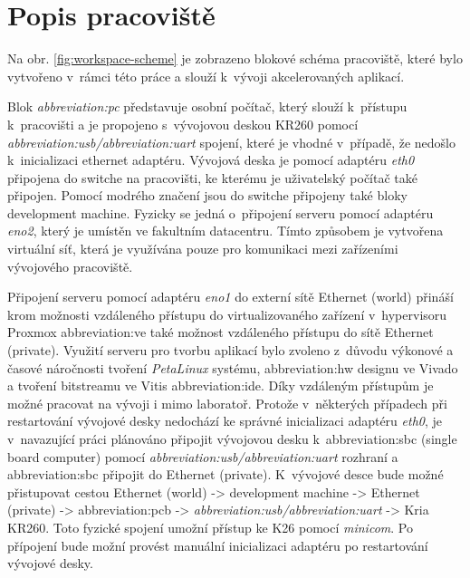 \documentclass[a4paper, twoside, 11pt]{article}
\newcommand{\fbar}{\FloatBarrier}
\begin{document}
	\fbar
\section{Popis pracoviště}\label{sec:popis-pracoviste}
	Na obr. \ref{fig:workspace-scheme} je zobrazeno blokové schéma pracoviště, které bylo vytvořeno v~rámci této práce a slouží k~vývoji akcelerovaných aplikací.\par
	Blok \textit{\gls{abbreviation:pc}} představuje osobní počítač, který slouží k~přístupu k~pracovišti a je propojeno s~vývojovou deskou KR260 pomocí \textit{\gls{abbreviation:usb}/\gls{abbreviation:uart}} spojení, které je vhodné v~případě, že nedošlo k~inicializaci ethernet adaptéru. Vývojová deska je pomocí adaptéru \textit{eth0} připojena do switche na pracovišti, ke kterému je uživatelský počítač také připojen. Pomocí \textcolor{ctublue}{modrého značení} jsou do switche připojeny také bloky \textcolor{ctuorange}{development machine}. Fyzicky se jedná o~připojení serveru pomocí adaptéru \textit{eno2}, který je umístěn ve fakultním datacentru. Tímto způsobem je vytvořena virtuální síť, která je využívána pouze pro komunikaci mezi zařízeními vývojového pracoviště.\par
	Připojení serveru pomocí adaptéru \textit{eno1} do externí sítě \textcolor{ctugreenyblue}{Ethernet (world)} přináší krom možnosti vzdáleného přístupu do virtualizovaného zařízení v~hypervisoru Proxmox \gls{abbreviation:ve} také možnost vzdáleného přístupu do sítě \textcolor{ctublue}{Ethernet (private)}. Využití serveru pro tvorbu aplikací bylo zvoleno z~důvodu výkonové a časové náročnosti tvoření \textit{PetaLinux} systému, \gls{abbreviation:hw} designu ve Vivado a tvoření bitstreamu ve Vitis \gls{abbreviation:ide}. Díky vzdáleným přístupům je možné pracovat na vývoji i mimo laboratoř. Protože v~některých případech při restartování vývojové desky nedochází ke správné inicializaci adaptéru \textit{eth0}, je v~navazující práci plánováno připojit vývojovou desku k~\gls{abbreviation:sbc} (single board computer) pomocí \textit{\gls{abbreviation:usb}/\gls{abbreviation:uart}} rozhraní a \gls{abbreviation:sbc} připojit do \textcolor{ctublue}{Ethernet (private)}. K~vývojové desce bude možné přistupovat cestou \textcolor{ctugreenyblue}{Ethernet (world)} -> \textcolor{ctuorange}{development machine} -> \textcolor{ctublue}{Ethernet (private)} -> \gls{abbreviation:pcb} -> \textit{\gls{abbreviation:usb}/\gls{abbreviation:uart}} -> Kria KR260. Toto fyzické spojení umožní přístup ke K26 pomocí \textit{minicom}. Po přípojení bude možní provést manuální inicializaci adaptéru po restartování vývojové desky.\par
\end{document}
